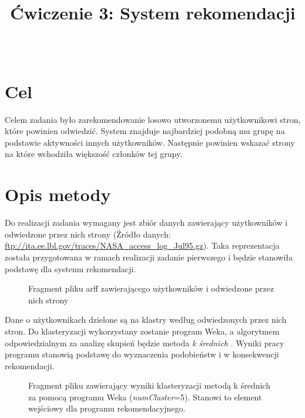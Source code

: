 \documentclass{classrep}
\author{%
  \studentinfo{Paweł Jeziorski}{234066}\\
  \studentinfo{Karol Podlewski}{234106}%
}
\title{Ćwiczenie 3: System rekomendacji}
\begin{document}
\maketitle


\tableofcontents
{}
\newpage

\section{Cel}
Celem zadania było zarekomendowanie losowo utworzonemu użytkownikowi stron, które powinien odwiedzić. System znajduje najbardziej podobną mu grupę na podstawie aktywności innych użytkowników. Następnie powinien wskazać strony na które wchodziła większość członków tej grupy.


\section{Opis metody}
Do realizacji zadania wymagany jest zbiór danych zawierający użytkowników i odwiedzone przez nich strony (Źródło danych: \url{ftp://ita.ee.lbl.gov/traces/NASA_access_log_Jul95.gz}). Taka reprezentacja została przygotowana w ramach realizacji zadanie pierwszego i będzie stanowiła podstawę dla systemu rekomendacji.
\begin{figure}[H] 
	\begin{center}
    \caption{Fragment pliku arff zawierającego użytkowników i odwiedzone przez nich strony}
    \label{StringToNominal_conf}
	\end{center}
\end{figure}
Dane o użytkownikach dzielone są na klastry według odwiedzonych przez nich stron. Do klasteryzacji wykorzystany zostanie program Weka, a algorytmem odpowiedzialnym za analizę skupień będzie metoda \textit{k średnich} \cite{Kmeans}. Wyniki pracy programu stanowią podstawę do wyznaczenia podobieństw i w konsekwencji rekomendacji.
\begin{figure}[H] 
	\begin{center}
    \caption{Fragment pliku zawierający wyniki klasteryzacji metodą k średnich za pomocą programu Weka (\textit{numCluster}=5). Stanowi to element wejściowy dla programu rekomendacyjnego. }
    \label{StringToNominal_conf}
	\end{center}
\end{figure}
\end{document}
